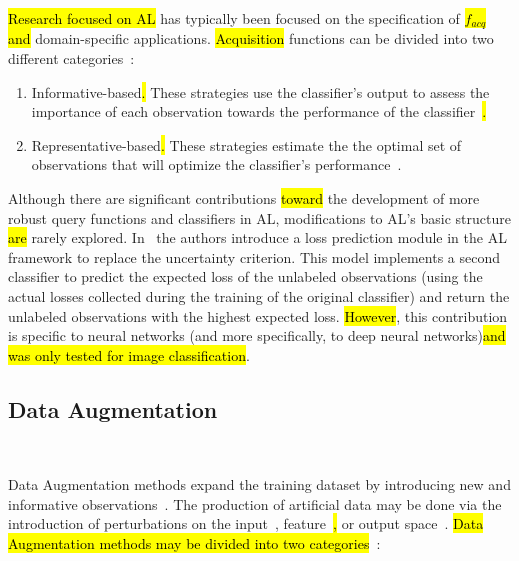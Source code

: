 \documentclass[preprint, 12pt]{elsarticle}
\begin{document}
\hl{Research focused on AL} has typically been focused on the
specification of \hl{$f_{acq}$ and} domain-specific
applications. \hl{Acquisition} functions can be divided into two different
categories~\cite{Gu2021, Kumar2020}: 

\begin{enumerate}

    \item Informative-based\hl{. }These strategies use the
        classifier's output to assess the importance of each observation
        towards the performance of the classifier~\cite{Fu2013}\hl{.}

    \item Representative-based\hl{. }These strategies estimate the
        the optimal set of observations that will optimize the classifier's
        performance~\cite{Kumar2020}.

\end{enumerate}

Although there are significant contributions \hl{toward} the development of
more robust query functions and classifiers in AL, modifications to AL's basic
structure \hl{are} rarely explored. In~\cite{Yoo2019} the authors introduce a
loss prediction module in the AL framework to replace the uncertainty
criterion.  This model implements a second classifier to predict the expected
loss of the unlabeled observations (using the actual losses collected during
the training of the original classifier) and return the unlabeled observations
with the highest expected loss. \hl{However}, this contribution is specific to
neural networks (and more specifically, to deep neural networks)\hl{and was
    only tested for image classification}.

\subsection{Data Augmentation}~\label{sec:data_augmentation}

Data Augmentation methods expand the training dataset by introducing new and
informative observations~\cite{Behpour2019}. The production of artificial data
may be done via the introduction of perturbations on the
input~\cite{fonseca2021improving}, feature~\cite{DeVries2017}\hl{,} or output
space~\cite{Behpour2019}. \hl{Data Augmentation methods may be divided into
two categories}~\cite{Shorten2019}:
\end{document}
